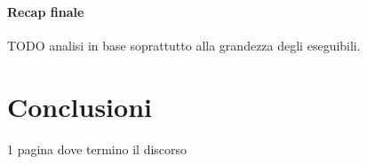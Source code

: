 \documentclass[12pt,a4paper,italian]{report}
\begin{document}
\subsubsection{Recap finale}

TODO analisi in base soprattutto alla grandezza degli eseguibili.


\newpage

\chapter{Conclusioni}

1 pagina dove termino il discorso

\newpage

\printbibliography
\end{document}
